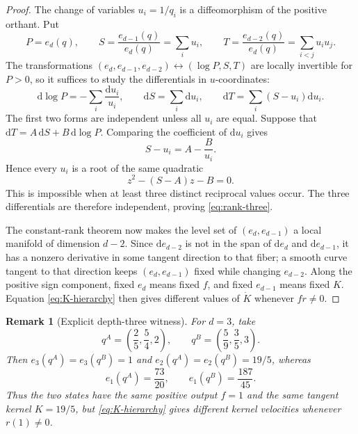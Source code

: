 \documentclass[11pt]{article}
\newtheorem*{remark*}{Remark}
\newcommand{\dd}{\mathrm{d}}
\begin{document}
\begin{proof}
The change of variables $u_i=1/q_i$ is a diffeomorphism of the positive orthant.  Put
\begin{equation}
  P=e_d(q),
  \qquad
  S=\frac{e_{d-1}(q)}{e_d(q)}=\sum_i u_i,
  \qquad
  T=\frac{e_{d-2}(q)}{e_d(q)}=\sum_{i<j}u_i u_j.
  \label{eq:reciprocal-coordinates}
\end{equation}
The transformations $(e_d,e_{d-1},e_{d-2})\leftrightarrow(\log P,S,T)$ are locally invertible for $P>0$, so it suffices to study the differentials in $u$-coordinates:
\begin{equation}
  \dd\log P=-\sum_i\frac{\dd u_i}{u_i},
  \qquad
  \dd S=\sum_i\dd u_i,
  \qquad
  \dd T=\sum_i(S-u_i)\dd u_i.
  \label{eq:three-differentials}
\end{equation}
The first two forms are independent unless all $u_i$ are equal.  Suppose that $\dd T=A\,\dd S+B\,\dd\log P$.  Comparing the coefficient of $\dd u_i$ gives
\begin{equation}
  S-u_i=A-\frac{B}{u_i}.
\end{equation}
Hence every $u_i$ is a root of the same quadratic
\begin{equation}
  z^2-(S-A)z-B=0.
\end{equation}
This is impossible when at least three distinct reciprocal values occur.  The three differentials are therefore independent, proving \eqref{eq:rank-three}.

The constant-rank theorem now makes the level set of $(e_d,e_{d-1})$ a local manifold of dimension $d-2$.  Since $\dd e_{d-2}$ is not in the span of $\dd e_d$ and $\dd e_{d-1}$, it has a nonzero derivative in some tangent direction to that fiber; a smooth curve tangent to that direction keeps $(e_d,e_{d-1})$ fixed while changing $e_{d-2}$.  Along the positive sign component, fixed $e_d$ means fixed $f$, and fixed $e_{d-1}$ means fixed $K$.  Equation \eqref{eq:K-hierarchy} then gives different values of $\dot K$ whenever $fr\neq0$.
\end{proof}

\begin{remark*}[Explicit depth-three witness]
For $d=3$, take
\[
  q^A=\left(\frac25,\frac54,2\right),
  \qquad
  q^B=\left(\frac59,\frac35,3\right).
\]
Then $e_3(q^A)=e_3(q^B)=1$ and $e_2(q^A)=e_2(q^B)=19/5$, whereas
\[
  e_1(q^A)=\frac{73}{20},
  \qquad
  e_1(q^B)=\frac{187}{45}.
\]
Thus the two states have the same positive output $f=1$ and the same tangent kernel $K=19/5$, but \eqref{eq:K-hierarchy} gives different kernel velocities whenever $r(1)\neq0$.
\end{remark*}
\end{document}

